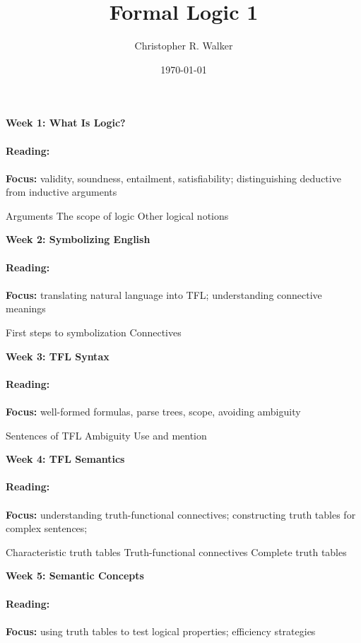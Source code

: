 \documentclass{article}
\title{Formal Logic 1}
\author{Christopher R. Walker}
\date{\today}
\begin{document}
\maketitle

\begin{outline}[enumerate]

\1 \textbf{Week 1: What Is Logic?}
\\
\\
\textbf{Reading:}
\cite[][Chapters 1-3 (pp. 2-25)]{Mag25}
\\
\\
\textbf{Focus:}
validity, soundness, entailment, satisfiability;
distinguishing deductive from inductive arguments

\2 Arguments
\2 The scope of logic
\2 Other logical notions

\1 \textbf{Week 2: Symbolizing English}
\\
\\
\textbf{Reading:}
\cite[][Chapters 4-5 (pp. 27-48)]{Mag25}
\\
\\
\textbf{Focus:}
translating natural language into TFL;
understanding connective meanings

\2 First steps to symbolization
\2 Connectives

\1 \textbf{Week 3: TFL Syntax}
\\
\\
\textbf{Reading:}
\cite[][Chapters 6-8 (pp. 49-67)]{Mag25}
\\
\\
\textbf{Focus:}
well-formed formulas, parse trees, scope, avoiding ambiguity

\2 Sentences of TFL
\2 Ambiguity
\2 Use and mention

\1 \textbf{Week 4: TFL Semantics}
\\
\\
\textbf{Reading:}
\cite[][Chapters 9-11 (pp. 69-84)]{Mag25}
\\
\\
\textbf{Focus:}
understanding truth-functional connectives;
constructing truth tables for complex sentences;

\2 Characteristic truth tables
\2 Truth-functional connectives
\2 Complete truth tables

\1 \textbf{Week 5: Semantic Concepts}
\\
\\
\textbf{Reading:}
\cite[][Chapters 12-14 (pp. 85-101)]{Mag25}
\\
\\
\textbf{Focus:}
using truth tables to test logical properties;
efficiency strategies


\end{outline}
\end{document}
